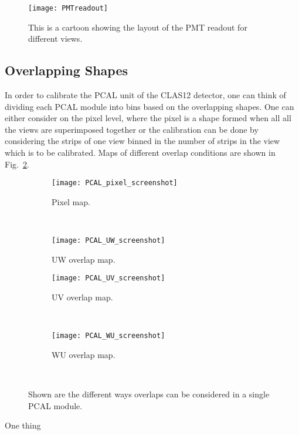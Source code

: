 \begin{figure}[h]
    \centering
    \texttt{[image: PMTreadout]}
    \caption{This is a cartoon showing the layout of the PMT readout for different views.}
    \label{fig:PMTreadout}
\end{figure}
\FloatBarrier

\FloatBarrier
\subsection{Overlapping Shapes}
In order to calibrate the PCAL unit of the CLAS12 detector, one can think of dividing each PCAL module into bins based on the 
overlapping shapes. One can either consider on the pixel level, where the pixel is a shape formed when all 
all the views are superimposed together or the calibration can be done by considering the strips of one 
view binned in the number of strips in the view which is to be calibrated. Maps of different overlap conditions are 
shown in Fig.~\ref{fig:PCAL_overlap}.

\begin{figure}[h]
  \centering
  \begin{subfigure}[b]{0.45\textwidth}
  \texttt{[image: PCAL\_pixel\_screenshot]}
  \caption{Pixel map.}
  \end{subfigure}
  ~
  \begin{subfigure}[b]{0.45\textwidth}
  \texttt{[image: PCAL\_UW\_screenshot]}
  \caption{UW overlap map.}
  \end{subfigure}

  \begin{subfigure}[b]{0.45\textwidth}
  \texttt{[image: PCAL\_UV\_screenshot]}
  \caption{UV overlap map.}
 \end{subfigure}
  ~
  \begin{subfigure}[b]{0.45\textwidth}
  \texttt{[image: PCAL\_WU\_screenshot]}
  \caption{WU overlap map.}
  \end{subfigure}
  ~
  \caption{Shown are the different ways overlaps can be considered in a single PCAL module.}
  \label{fig:PCAL_overlap}
\end{figure}
\FloatBarrier

One thing
\clearpage

